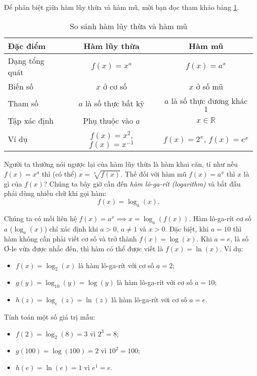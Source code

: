 Để phân biệt giữa hàm lũy thừa và hàm mũ, mời bạn đọc tham khảo bảng \ref{tab:bảng so sánh lũy thừa số mũ}.
\begin{table}[h]
\centering
\begin{tabular}{|l|c|c|}
\hline
\textbf{Đặc điểm} & \textbf{Hàm lũy thừa} & \textbf{Hàm mũ} \\
\hline
Dạng tổng quát & $f(x) = x^a$ & $f(x) = a^x$ \\
\hline
Biến số & $x$ ở cơ số & $x$ ở số mũ \\
\hline
Tham số & $a$ là số thực bất kỳ & $a$ là số thực dương khác $1$\\
\hline
Tập xác định & Phụ thuộc vào $a$ & $x \in \mathbb{R}$ \\
\hline
Ví dụ & $f(x) = x^2$, $f(x) = x^{-1}$ & $f(x) = 2^x$, $f(x) = e^x$ \\
\hline
\end{tabular}
\caption{So sánh hàm lũy thừa và hàm mũ}
\label{tab:bảng so sánh lũy thừa số mũ}
\end{table}

Người ta thường nói ngược lại của hàm lũy thừa là hàm khai căn, tỉ như nếu $f(x) = x^a$ thì (có thể) $x = \sqrt[a]{f(x)}$. Thế đối với hàm mũ $f(x) = a^x$ thì $x$ là gì của $f(x)$? Chúng ta bây giờ cần đến \emph{hàm lô-ga-rít (logarithm)} và bắt đầu phải dùng nhiều chữ khi gọi hàm: $$f(x) = \log_a {\left(x\right)}.$$

Chúng ta có mối liên hệ $f(x) = a^x \implies x = \log_a {\left(f(x)\right)}$. Hàm lô-ga-rít cơ số $a$ ($\log_a {\left(x\right)}$) chỉ xác định khi $a > 0$, $a \neq 1$ và $x > 0$. Đặc biệt, khi $a = 10$ thì hàm không cần phải viết cơ số và trở thành $f(x) = \log(x)$. Khi $a = e$, là số Ơ-le vừa được nhắc đến, thì hàm có thể được viết là $f(x) = \ln(x)$. Ví dụ:
\begin{itemize}
   \item $f(x) = \log_2 (x)$ là hàm lô-ga-rít với cơ số $a = 2$;
   \item $g(y) = \log_{10} (y) = \log(y)$ là hàm lô-ga-rít với cơ số $a = 10$;
   \item $h(z) = \log_e (z)=\ln(z)$ là hàm lô-ga-rít với cơ số $a = e$.
\end{itemize}
Tính toán một số giá trị mẫu:
\begin{itemize}
   \item $f(2) = \log_2 (8) = 3$ vì $2^3 = 8$;
   \item $g(100) = \log (100) = 2$ vì $10^2 = 100$;
   \item $h(e) = \ln (e) = 1$ vì $e^1 = e$.
\end{itemize}